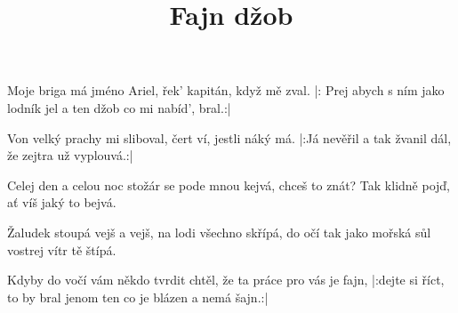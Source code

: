 \beginsong

\title{Fajn džob}

\beginverse
Moje briga má jméno Ariel,
řek' kapitán, když mě zval.
|: Prej abych s ním jako lodník jel
a ten džob co mi nabíd', bral.:|
\endverse

\beginverse
Von velký prachy mi sliboval,
čert ví, jestli náký má.
|:Já nevěřil a tak žvanil dál,
že zejtra už vyplouvá.:|
\endverse

\beginrefrain
{}Celej den a celou noc
stožár se pode mnou kejvá,
chceš to znát? Tak klidně pojď,
ať víš jaký to bejvá.

Žaludek stoupá vejš a vejš,
na lodi všechno skřípá,
do očí tak jako mořská sůl
vostrej vítr tě štípá.
\endrefrain

\beginverse
Kdyby do vočí vám někdo tvrdit chtěl,
že ta práce pro vás je fajn,
|:dejte si říct, to by bral jenom ten
co je blázen a nemá šajn.:|
\endverse



